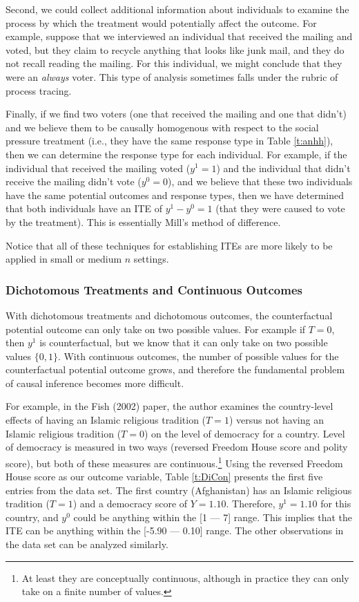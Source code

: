 \documentclass{article}
\begin{document}
Second, we could collect additional information about individuals to examine the process by which the treatment would potentially affect the outcome. For example, suppose that we interviewed an individual that received the mailing and voted, but they claim to recycle anything that looks like junk mail, and they do not recall reading the mailing. For this individual, we might conclude that they were an \emph{always} voter. This type of analysis sometimes falls under the rubric of process tracing. 

Finally, if we find two voters (one that received the mailing and one that didn't) and we believe them to be causally homogenous with respect to the social pressure treatment (i.e., they have the same response type in Table \ref{t:anhh}), then we can determine the response type for each individual. For example, if the individual that received the mailing voted ($y^1 = 1$) and the individual that didn't receive the mailing didn't vote ($y^0 = 0$), and we believe that these two individuals have the same potential outcomes and response types, then we have determined that both individuals have an ITE of $y^1 - y^0 = 1$ (that they were caused to vote by the treatment). This is essentially Mill's method of difference. 

Notice that all of these techniques for establishing ITEs are more likely to be applied in small or medium $n$ settings. 


\subsubsection{Dichotomous Treatments and Continuous Outcomes}

With dichotomous treatments and dichotomous outcomes, the counterfactual potential outcome can only take on two possible values. For example if $T=0$, then $y^1$ is counterfactual, but we know that it can only take on two possible values $\{0,1\}$. With continuous outcomes, the number of possible values for the counterfactual potential outcome grows, and therefore the fundamental problem of causal inference becomes more difficult.

For example, in the Fish (2002) paper, the author examines the country-level effects of having an Islamic religious tradition ($T=1$) versus not having an Islamic religious tradition ($T=0$) on the level of democracy for a country. Level of democracy is measured in two ways (reversed Freedom House score and polity score), but both of these measures are continuous.\footnote{At least they are conceptually continuous, although in practice they can only take on a finite number of values.} Using the reversed Freedom House score as our outcome variable, Table \ref{t:DiCon} presents the first five entries from the data set. The first country (Afghanistan) has an Islamic religious tradition ($T=1$) and  a democracy score of $Y=1.10$. Therefore,  $y^1= 1.10$ for this country, and $y^0$ could be anything within the [1 --- 7] range. This implies that the ITE can be anything within the [-5.90 --- 0.10] range. The other observations in the data set can be analyzed similarly. 
\end{document}

